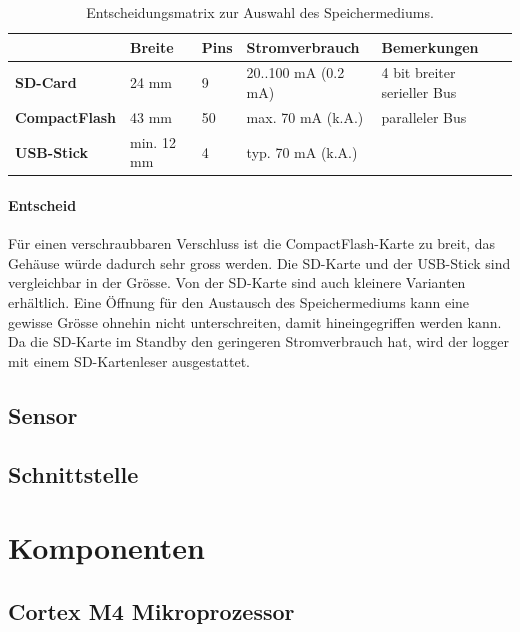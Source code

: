 \begin{table}
\begin{tabular}{|l|l|l|l|l|}
	\hline
	                      & \textbf{Breite} & \textbf{Pins} & \textbf{Stromverbrauch} & \textbf{Bemerkungen}        \\ \hline
	\textbf{SD-Card}      & 24 mm           & 9             & 20..100 mA (0.2 mA)     & 4 bit breiter serieller Bus \\ \hline
	\textbf{CompactFlash} & 43 mm           & 50            & max. 70 mA (k.A.)       & paralleler Bus              \\ \hline
	\textbf{USB-Stick}    & min. 12 mm      & 4             & typ. 70 mA (k.A.) &  \\ \hline
\end{tabular} 
\caption{Entscheidungsmatrix zur Auswahl des Speichermediums.}
\label{table.speichermedium}
\end{table} 



\paragraph{Entscheid} Für einen verschraubbaren Verschluss ist die CompactFlash-Karte zu breit, das Gehäuse würde dadurch sehr gross werden. Die SD-Karte und der USB-Stick sind vergleichbar in der Grösse. Von der SD-Karte sind auch kleinere Varianten erhältlich. Eine Öffnung für den Austausch des Speichermediums kann eine gewisse Grösse ohnehin nicht unterschreiten, damit hineingegriffen werden kann. Da die SD-Karte im Standby den geringeren Stromverbrauch hat, wird der \gls{logger} mit einem SD-Kartenleser ausgestattet.

\subsection{Sensor}

\subsection{Schnittstelle}



\section{Komponenten}
\subsection{Cortex M4 Mikroprozessor}

